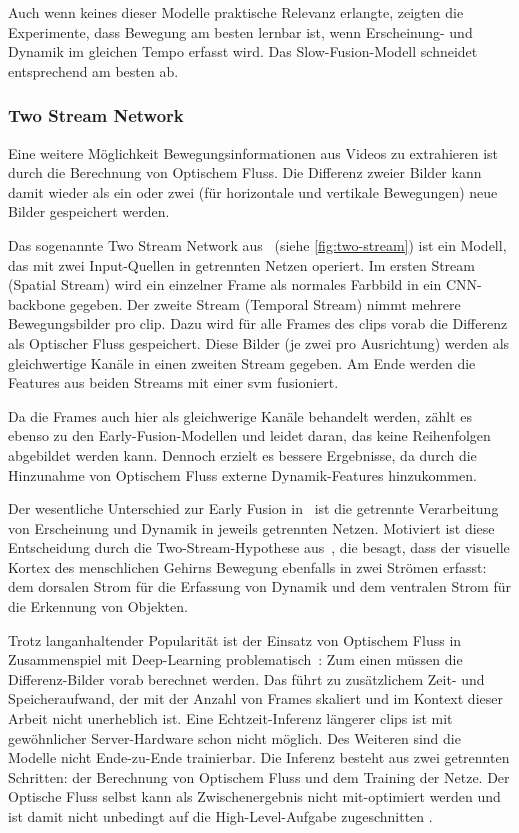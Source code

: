 Auch wenn keines dieser Modelle praktische Relevanz erlangte, zeigten die Experimente, dass Bewegung am besten lernbar ist, wenn Erscheinung- und Dynamik im gleichen Tempo erfasst wird.
Das Slow-Fusion-Modell schneidet entsprechend am besten ab.

\subsubsection{Two Stream Network}

Eine weitere Möglichkeit Bewegungsinformationen aus Videos zu extrahieren ist durch die Berechnung von Optischem Fluss.
Die Differenz zweier Bilder kann damit wieder als ein oder zwei (für horizontale und vertikale Bewegungen) neue Bilder gespeichert werden.

Das sogenannte Two Stream Network aus~\cite{Simonyan14} (siehe \autoref{fig:two-stream}) ist ein Modell, das mit zwei Input-Quellen in getrennten Netzen operiert.
Im ersten Stream (Spatial Stream) wird ein einzelner Frame als normales Farbbild in ein CNN-backbone gegeben.
Der zweite Stream (Temporal Stream) nimmt mehrere Bewegungsbilder pro \gls{clip}.
Dazu wird für alle Frames des \glspl{clip} vorab die Differenz als Optischer Fluss gespeichert.
Diese Bilder (je zwei pro Ausrichtung) werden als gleichwertige Kanäle in einen zweiten Stream gegeben.
Am Ende werden die Features aus beiden Streams mit einer \gls{svm} fusioniert.

Da die Frames auch hier als gleichwerige Kanäle behandelt werden, zählt es ebenso zu den Early-Fusion-Modellen und leidet daran, das keine Reihenfolgen abgebildet werden kann.
Dennoch erzielt es bessere Ergebnisse, da durch die Hinzunahme von Optischem Fluss externe Dynamik-Features hinzukommen.

Der wesentliche Unterschied zur Early Fusion in~\cite{Karpathy14} ist die getrennte Verarbeitung von Erscheinung und Dynamik in jeweils getrennten Netzen.
Motiviert ist diese Entscheidung durch die Two-Stream-Hypothese aus~\cite{Goodale92}, die besagt, dass der visuelle Kortex des menschlichen Gehirns Bewegung ebenfalls in zwei Strömen erfasst:
dem dorsalen Strom für die Erfassung von Dynamik und dem ventralen Strom für die Erkennung von Objekten.

Trotz langanhaltender Popularität ist der Einsatz von Optischem Fluss in Zusammenspiel mit Deep-Learning problematisch~\cite{Zhu17}:
Zum einen müssen die Differenz-Bilder vorab berechnet werden.
Das führt zu zusätzlichem Zeit- und Speicheraufwand, der mit der Anzahl von Frames skaliert und im Kontext dieser Arbeit nicht unerheblich ist.
Eine Echtzeit-Inferenz längerer \glspl{clip} ist mit gewöhnlicher Server-Hardware schon nicht möglich.
Des Weiteren sind die Modelle nicht Ende-zu-Ende trainierbar.
Die Inferenz besteht aus zwei getrennten Schritten: der Berechnung von Optischem Fluss und dem Training der Netze.
Der Optische Fluss selbst kann als Zwischenergebnis nicht mit-optimiert werden und ist damit nicht unbedingt auf die High-Level-Aufgabe zugeschnitten \cite{Zhu17}.


